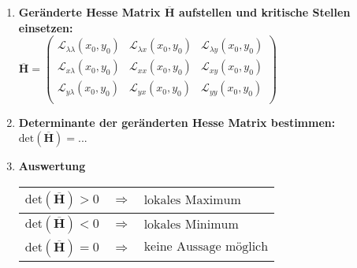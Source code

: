 \begin{enumerate}[itemsep=1ex]
    \item \textbf{Geränderte Hesse Matrix $\overline{\mathbf{H}}$ aufstellen und kritische Stellen einsetzen:}\\
    $\overline{\mathbf{H}} = 
    \left(
        \begin{matrix}
            {{\mathcal{L}_{\lambda\lambda}(x_0, y_0)}}&{{\mathcal{L}_{\lambda x}(x_0, y_0)}}&{{\mathcal{L}_{\lambda y}(x_0, y_0)}}\\
            {{\mathcal{L}_{x\lambda}(x_0, y_0)}}&{{\mathcal{L}_{xx}(x_0, y_0)}}&{{\mathcal{L}_{xy}(x_0, y_0)}}\\
            {{\mathcal{L}_{y\lambda}(x_0, y_0)}}&{{\mathcal{L}_{yx}(x_0, y_0)}}&{{\mathcal{L}_{yy}(x_0, y_0)}}\\
        \end{matrix}
    \right) $

    \item \textbf{Determinante der geränderten Hesse Matrix bestimmen:}\\
    $\text{det}\left(\overline{\mathbf{H}}\right) = ... $

    \item \textbf{Auswertung}\\
    \begin{tabular}{lll}
        \hline
        $\text{det}\left(\overline{\mathbf{H}}\right) > 0$ &$\Longrightarrow$& $\text{lokales Maximum}$\\
        \hline
        $\text{det}\left(\overline{\mathbf{H}}\right) < 0$ &$\Longrightarrow$& $\text{lokales Minimum}$\\
        \hline
        $\text{det}\left(\overline{\mathbf{H}}\right) = 0$ &$\Longrightarrow$& $\text{keine Aussage möglich}$\\
        \hline
    \end{tabular}

\end{enumerate}
